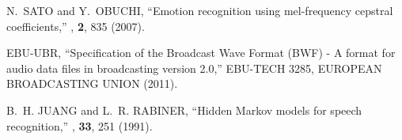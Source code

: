 \documentclass{ntmanuscript}
\begin{document}
\begin{thebibliography}{10}
N.~SATO and Y.~OBUCHI,
\newblock ``Emotion recognition using mel-frequency cepstral coefficients,''
, {\bf 2}, 835 (2007).

EBU-UBR,
\newblock ``Specification of the Broadcast Wave Format (BWF) - A format for
  audio data files in broadcasting version 2.0,''
\newblock  EBU-TECH 3285, EUROPEAN BROADCASTING UNION (2011).

B.~H. JUANG and L.~R. RABINER,
\newblock ``Hidden Markov models for speech recognition,''
, {\bf 33}, 251 (1991).

\end{thebibliography}
\end{document}
